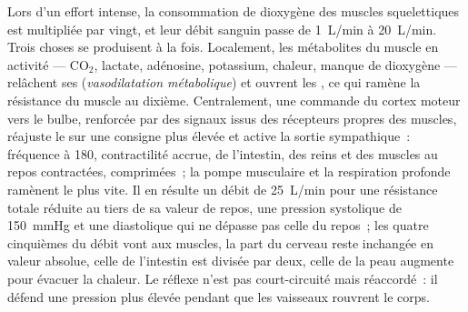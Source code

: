 \begin{proposition}[L'exercice]\label{prop:b2:blood-pressure:exercise}
Lors d'un effort intense, la consommation de dioxygène des muscles
squelettiques est multipliée par vingt, et leur débit sanguin passe de
\qty{1}{L/min} à \qty{20}{L/min}. Trois choses se produisent à la fois.
Localement, les métabolites du muscle en activité --- $\mathrm{CO_2}$,
lactate, adénosine, potassium, chaleur, manque de dioxygène --- relâchent
ses  (\emph{vasodilatation métabolique}) et ouvrent les
, ce qui ramène la résistance du muscle au dixième.
Centralement, une commande du cortex moteur vers le bulbe, renforcée par
des signaux issus des récepteurs propres des muscles, réajuste le
 sur une consigne plus élevée et active la sortie
sympathique~: fréquence à 180, contractilité accrue,  de
l'intestin, des reins et des muscles au repos contractées, 
comprimées~; la pompe musculaire et la respiration profonde ramènent le
 plus vite. Il en résulte un débit de \qty{25}{L/min} pour une
résistance totale réduite au tiers de sa valeur de repos, une pression
systolique de \qty{150}{mmHg} et une diastolique qui ne dépasse pas celle
du repos~; les quatre cinquièmes du débit vont aux muscles, la part du
cerveau reste inchangée en valeur absolue, celle de l'intestin est
divisée par deux, celle de la peau augmente pour évacuer la chaleur. Le
réflexe n'est pas court-circuité mais réaccordé~: il défend une pression
plus élevée pendant que les vaisseaux rouvrent le corps.
\end{proposition}

